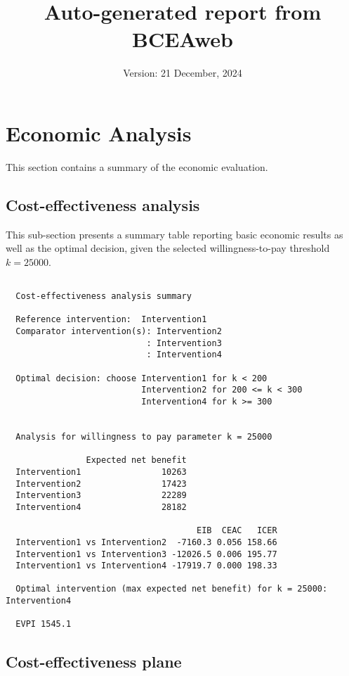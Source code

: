 \documentclass[
]{article}
\title{Auto-generated report from BCEAweb}
\author{}
\date{\vspace{-2.5em}Version: 21 December, 2024}
\begin{document}
\maketitle

\hypertarget{economic-analysis}{%
\section{Economic Analysis}\label{economic-analysis}}

This section contains a summary of the economic evaluation.

\hypertarget{cost-effectiveness-analysis}{%
\subsection{Cost-effectiveness
analysis}\label{cost-effectiveness-analysis}}

This sub-section presents a summary table reporting basic economic
results as well as the optimal decision, given the selected
willingness-to-pay threshold \(k=25000\).

\begin{verbatim}
  
  Cost-effectiveness analysis summary 
  
  Reference intervention:  Intervention1
  Comparator intervention(s): Intervention2
                            : Intervention3
                            : Intervention4
  
  Optimal decision: choose Intervention1 for k < 200
                           Intervention2 for 200 <= k < 300
                           Intervention4 for k >= 300
  
  
  Analysis for willingness to pay parameter k = 25000
  
                Expected net benefit
  Intervention1                10263
  Intervention2                17423
  Intervention3                22289
  Intervention4                28182
  
                                      EIB  CEAC   ICER
  Intervention1 vs Intervention2  -7160.3 0.056 158.66
  Intervention1 vs Intervention3 -12026.5 0.006 195.77
  Intervention1 vs Intervention4 -17919.7 0.000 198.33
  
  Optimal intervention (max expected net benefit) for k = 25000: Intervention4
             
  EVPI 1545.1
\end{verbatim}

\hypertarget{cost-effectiveness-plane}{%
\subsection{Cost-effectiveness plane}\label{cost-effectiveness-plane}}
\end{document}
